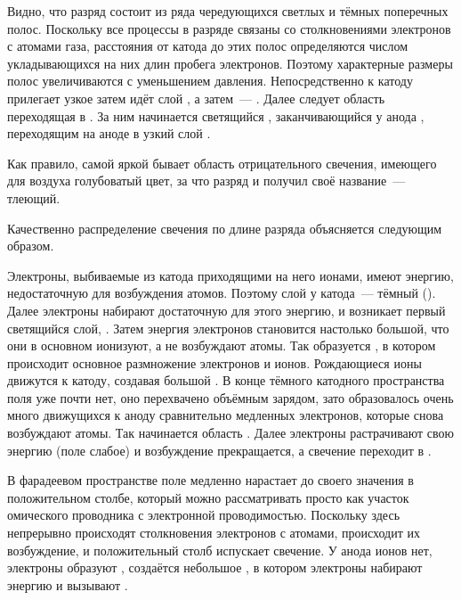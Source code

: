 Видно, что разряд состоит из ряда чередующихся светлых и тёмных поперечных
полос. Поскольку все процессы в разряде
связаны со столкновениями электронов с атомами газа, расстояния от катода до
этих полос определяются числом
укладывающихся на них длин пробега электронов. Поэтому характерные размеры полос
увеличиваются с уменьшением давления.
Непосредственно к катоду прилегает узкое 
затем идёт слой , а
затем~--- . Далее следует область
 переходящая в
. За ним начинается светящийся
, заканчивающийся у анода
, переходящим на аноде в узкий слой
.

Как правило, самой яркой бывает область отрицательного свечения, имеющего для
воздуха голубоватый цвет, за что разряд и
получил своё название~--- тлеющий.

Качественно распределение свечения по длине разряда объясняется следующим
образом.

Электроны, выбиваемые из катода приходящими на него ионами, имеют энергию,
недостаточную для возбуждения атомов. Поэтому
слой у катода~--- тёмный (). Далее электроны
набирают достаточную для этого энергию, и
возникает первый светящийся слой, . Затем энергия
электронов становится настолько большой, что
они в основном ионизуют, а не возбуждают атомы. Так образуется , в котором происходит
основное размножение электронов и ионов. Рождающиеся ионы движутся к катоду,
создавая большой . В конце тёмного катодного пространства поля уже почти нет, оно
перехвачено объёмным зарядом, зато
образовалось очень много движущихся к аноду сравнительно медленных электронов,
которые снова возбуждают атомы. Так
начинается область . Далее электроны
растрачивают свою энергию (поле слабое) и возбуждение
прекращается, а свечение переходит в .

В фарадеевом пространстве поле медленно нарастает до своего значения в
положительном столбе, который можно рассматривать
просто как участок омического проводника с электронной проводимостью. Поскольку
здесь непрерывно происходят столкновения
электронов с атомами, происходит их возбуждение, и положительный столб испускает
свечение. У анода ионов нет, электроны
образуют , создаётся небольшое
, в котором электроны
набирают энергию и вызывают .

